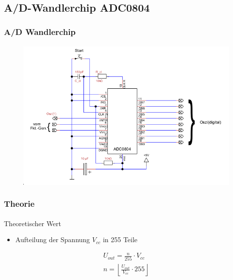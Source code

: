 \subsection{A/D-Wandlerchip ADC0804} %
\label{sub:A/D-Wandlerchip_ADC0804}
\begin{frame}
    \frametitle{A/D Wandlerchip}
    \framesubtitle{}
    \begin{figure}[H]
    \begin{center}
            \includegraphics[scale=0.4]{./img/schaltung/ADWandler_0.png}
    \end{center}
    \end{figure}
\end{frame}

\begin{frame}
    \frametitle{Theorie}
    \framesubtitle{}
    \begin{block}{Theoretischer Wert}
        \begin{itemize}
            \item Aufteilung der Spannung $V_{cc}$ in 255 Teile
        \end{itemize}
            \begin{gather*}
                U_{out} = \frac{n}{255} \cdot V_{cc} \\
                n = \left\lfloor \frac{U_{out}}{V_{cc}} \cdot 255 \right\rfloor
            \end{gather*}
    \end{block}
\end{frame}

